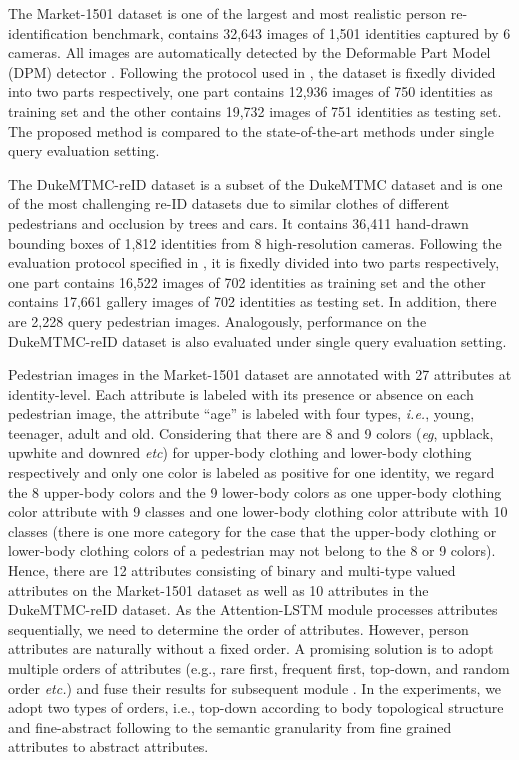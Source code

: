 \documentclass[sigconf]{acmart}
\begin{document}
The Market-1501 dataset is one of the largest and most realistic person re-identification benchmark, contains 32,643 images of 1,501 identities captured by 6 cameras. All images are automatically detected by the Deformable Part Model (DPM) detector \cite{15}. Following the protocol used in \cite{17}, the dataset is fixedly divided into two parts respectively, one part contains 12,936 images of 750 identities as training set and the other contains 19,732 images of 751 identities as testing set. The proposed method is compared to the state-of-the-art methods under single query evaluation setting.

The DukeMTMC-reID dataset is a subset of the DukeMTMC dataset \cite{19} and is one of the most challenging re-ID datasets due to similar clothes of different pedestrians and occlusion by trees and cars. It contains 36,411 hand-drawn bounding boxes of 1,812 identities from 8 high-resolution cameras. Following the evaluation protocol specified in \cite{18}, it is fixedly divided into two parts respectively, one part contains 16,522 images of 702 identities as training set and the other contains 17,661 gallery images of 702 identities as testing set. In addition, there are 2,228 query pedestrian images. Analogously, performance on the DukeMTMC-reID dataset is also evaluated under single query evaluation setting.


Pedestrian images in the Market-1501 dataset are annotated with 27 attributes at identity-level. Each attribute is labeled with its presence or absence on each pedestrian image, the attribute ``age'' is labeled with four types, \textit{i.e.}, young, teenager, adult and old. Considering that there are 8 and 9 colors (\textit{eg},  upblack, upwhite and downred \textit{etc}) for upper-body clothing and lower-body clothing respectively and only one color is labeled as positive for one identity, we regard the 8 upper-body colors and the 9 lower-body colors as one upper-body clothing color attribute with 9 classes and one lower-body clothing color attribute with 10 classes (there is one more category for the case that the upper-body clothing or lower-body clothing colors of a pedestrian may not belong to the 8 or 9 colors). Hence, there are 12 attributes consisting of binary and multi-type valued attributes on the Market-1501 dataset as well as 10 attributes in the DukeMTMC-reID dataset. As the Attention-LSTM module processes attributes sequentially, we need to determine the order of attributes. However, person attributes are naturally without a fixed order. A promising solution is to adopt multiple orders of attributes (e.g., rare first, frequent first, top-down, and random order \textit{etc.}) and fuse their results for subsequent module \cite{56}. In the experiments, we adopt two types of orders, i.e., top-down according to body topological structure and fine-abstract following to the semantic granularity from fine grained attributes to abstract attributes.
\end{document}

